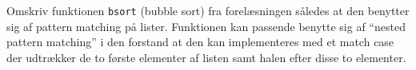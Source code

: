 Omskriv funktionen \texttt{bsort} (bubble sort) fra forelæsningen
  således at den benytter sig af pattern matching på
  lister. Funktionen kan passende benytte sig af ``nested pattern
  matching'' i den forstand at den kan implementeres med et match case
  der udtrækker de to første elementer af listen samt halen efter
  disse to elementer.